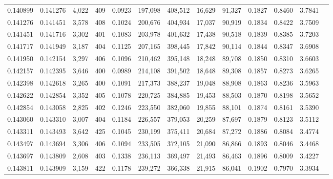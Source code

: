 \begin{tabular}{rrrrrrrrrrrrr}
0.140899 & 0.141276 & 4,022 & 409 &                                     0.0923 & 197,098 & 408,512 &  16,629 &  91,327 & 0.1827 & 0.8460 & 3.7841 \\
0.141276 & 0.141451 & 3,578 & 408 &                                     0.1024 & 200,676 & 404,934 &  17,037 &  90,919 & 0.1834 & 0.8422 & 3.7509 \\
0.141451 & 0.141716 & 3,302 & 401 &                                     0.1083 & 203,978 & 401,632 &  17,438 &  90,518 & 0.1839 & 0.8385 & 3.7203 \\
0.141717 & 0.141949 & 3,187 & 404 &                                     0.1125 & 207,165 & 398,445 &  17,842 &  90,114 & 0.1844 & 0.8347 & 3.6908 \\
0.141950 & 0.142154 & 3,297 & 406 &                                     0.1096 & 210,462 & 395,148 &  18,248 &  89,708 & 0.1850 & 0.8310 & 3.6603 \\
0.142157 & 0.142395 & 3,646 & 400 &                                     0.0989 & 214,108 & 391,502 &  18,648 &  89,308 & 0.1857 & 0.8273 & 3.6265 \\
0.142398 & 0.142618 & 3,265 & 400 &                                     0.1091 & 217,373 & 388,237 &  19,048 &  88,908 & 0.1863 & 0.8236 & 3.5963 \\
0.142622 & 0.142854 & 3,352 & 405 &                                     0.1078 & 220,725 & 384,885 &  19,453 &  88,503 & 0.1870 & 0.8198 & 3.5652 \\
0.142854 & 0.143058 & 2,825 & 402 &                                     0.1246 & 223,550 & 382,060 &  19,855 &  88,101 & 0.1874 & 0.8161 & 3.5390 \\
0.143060 & 0.143310 & 3,007 & 404 &                                     0.1184 & 226,557 & 379,053 &  20,259 &  87,697 & 0.1879 & 0.8123 & 3.5112 \\
0.143311 & 0.143493 & 3,642 & 425 &                                     0.1045 & 230,199 & 375,411 &  20,684 &  87,272 & 0.1886 & 0.8084 & 3.4774 \\
0.143497 & 0.143694 & 3,306 & 406 &                                     0.1094 & 233,505 & 372,105 &  21,090 &  86,866 & 0.1893 & 0.8046 & 3.4468 \\
0.143697 & 0.143809 & 2,608 & 403 &                                     0.1338 & 236,113 & 369,497 &  21,493 &  86,463 & 0.1896 & 0.8009 & 3.4227 \\
0.143811 & 0.143909 & 3,159 & 422 &                                     0.1178 & 239,272 & 366,338 &  21,915 &  86,041 & 0.1902 & 0.7970 & 3.3934 \\

\end{tabular}
